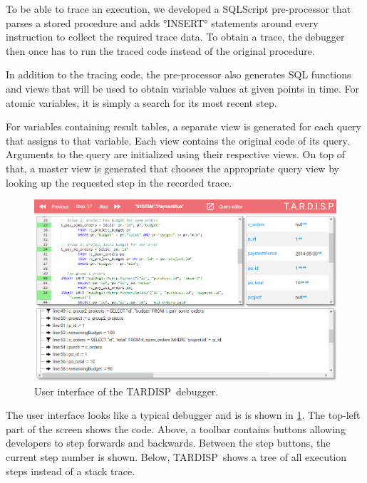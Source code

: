\documentclass[english,conference]{IEEEtran}
\newcommand{\todo}[2][]{\pdfmargincomment[author={#1}]{#2}}
\newcommand{\tool}{TAR\-DISP}
\begin{document}

To be able to trace an execution, we developed a SQLScript pre-processor that parses a stored procedure and adds °INSERT° statements around every instruction to collect the required trace data.
To obtain a trace, the debugger then once has to run the traced code instead of the original procedure.

In addition to the tracing code, the pre-processor also generates SQL functions and views that will be used to obtain variable values at given points in time.
For atomic variables, it is simply a search for its most recent step.

For variables containing result tables, a separate view is generated for each query that assigns to that variable.
Each view contains the original code of its query.
Arguments to the query are initialized using their respective views.
On top of that, a master view is generated that chooses the appropriate query view by looking up the requested step in the recorded trace.

\begin{figure}
	\centering
		\includegraphics[width=\linewidth]{odb.png}
	\caption{User interface of the \tool\ debugger.}
	\label{fig:odb}
\end{figure}

The user interface looks like a typical debugger and is is shown in \cref{fig:odb}.
The top-left part of the screen shows the code.
Above, a toolbar contains buttons allowing developers to step forwards and backwards.
Between the step buttons, the current step number is shown.
Below, \tool\ shows a tree of all execution steps instead of a stack trace.
\end{document}
